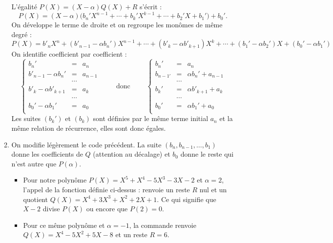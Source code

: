 \documentclass[class=report,crop=false]{standalone}
\begin{document}
\begin{enumerate}
\begin{enumerate}
    L'égalité $P(X) = (X-\alpha)Q(X) + R$ s'écrit :
    $$P(X) = (X-\alpha)\big(b_{n}'X^{n-1}+\cdots +b_k'X^{k-1}+\cdots +b_2'X+b_1'\big) + b_0'.$$
   On développe le terme de droite et on regroupe les monômes de même degré :
   $$P(X) = b'_{n}X^{n}+(b'_{n-1}-\alpha b_n')X^{n-1} + \cdots + (b'_{k}-\alpha b'_{k+1})X^{k} 
    +\cdots+(b_1'-\alpha b_2')X+(b_0'-\alpha b_1')$$
   On identifie coefficient par coefficient :
   $$\left\{
   \begin{array}{rcl}
   b_n' &=& a_n \\
   b'_{n-1}-\alpha b_n' &=& a_{n-1} \\
   &\cdots& \\
   b'_{k}-\alpha b'_{k+1}&=& a_k \\
   &\cdots& \\
   b_0'-\alpha b_1' &=& a_0 \\
   \end{array}
   \right.
   \qquad \text{ donc }\qquad
 \left\{
   \begin{array}{rcl}
   b_n' &=& a_n \\
   b_{n-1'} &=& \alpha b_n' + a_{n-1} \\
   &\cdots& \\
   b_{k}' &=& \alpha b'_{k+1} + a_k \\
   &\cdots& \\
   b_0'&=& \alpha b_1' + a_0 \\
   \end{array}
   \right.$$
   Les suites $(b_k')$ et $(b_k)$ sont définies par le même terme initial $a_n$ et 
   la même relation de récurrence, elles sont donc égales.
          
    \item On modifie légèrement le code précédent. La suite
    $(b_{n},b_{n-1},\ldots,b_1)$ donne les coefficients de $Q$ (attention au décalage) et $b_0$
    donne le reste qui n'est autre que $P(\alpha)$.
    

    \begin{itemize}
      \item Pour notre polynôme $P(X) = X^5 + X^4 - 5X^3 - 3X - 2$ 
    et $\alpha = 2$, l'appel de la fonction définie ci-dessus : 
    renvoie un reste $R$ nul et un quotient $Q(X) = X^4 + 3X^3 + X^2 + 2X + 1$.
    Ce qui signifie que $X-2$ divise $P(X)$ ou encore que $P(2)=0$.

      \item Pour ce même polynôme et $\alpha = -1$, la commande 
    renvoie $Q(X) =X^4 - 5X^2 + 5X - 8$ et un reste $R = 6$.
    

\end{itemize}
\end{enumerate}
\end{enumerate}
\end{document}
